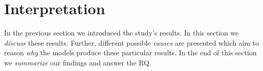 \section{Interpretation}
\label{chp:study:sec:interpretation}
In the previous section we introduced the study's results.
In this section we \textit{discuss} these results.
Further, different possible \textit{causes} are presented which aim to reason \textit{why} the models produce these particular results.
In the end of this section we \textit{summarize} our findings and answer the \ac{RQ}.




